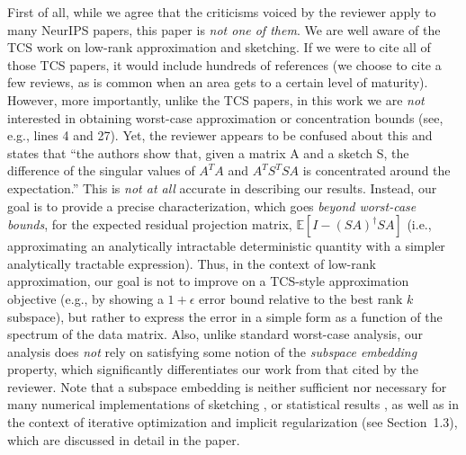 \documentclass{article}
\begin{document}
First of all, while we agree that the criticisms voiced by the
reviewer apply to many NeurIPS papers, this paper is \emph{not one of
  them}. We are well aware of the TCS work on low-rank
approximation and sketching. If we were to cite all of those TCS papers, it would
include hundreds of references (we choose to cite a few reviews, as is
common when an area gets to a certain level of maturity). However, more importantly,
unlike the TCS papers, in this work we are \emph{not} interested in obtaining
worst-case approximation or concentration bounds (see, e.g., lines 4
and 27). Yet, the reviewer appears to be
confused about this and states that ``the authors
show that, given a matrix A and a sketch S, the difference of the
singular values of $A^TA$  and $A^TS^TSA$ is concentrated around the
expectation.'' This is \emph{not at all} accurate in describing our
results. Instead, our goal is to provide a precise characterization,
which goes \emph{beyond worst-case bounds}, for the expected residual
projection matrix, $\mathbb{E}[I-(SA)^\dagger SA]$ (i.e., approximating an
analytically intractable deterministic quantity with a simpler
analytically tractable expression). Thus, in the context of low-rank
approximation, our goal is not
to improve on a TCS-style approximation objective (e.g., by showing a
$1+\epsilon$ error bound relative to the best rank $k$ subspace),
but rather to express the error in a simple form as a function of the
spectrum of the data matrix.  Also, unlike standard worst-case analysis, our analysis
does \emph{not} rely on satisfying some notion of the \emph{subspace
  embedding} property, which
significantly differentiates our work from that cited by the
reviewer. Note that a subspace embedding is
neither sufficient nor necessary for many numerical implementations of
sketching \citep{blendenpik,lsrn},
or statistical results
\citep{GarveshMahoney_JMLR,dobriban2019asymptotics,yang2020reduce},
as well as in the context of iterative optimization and
implicit regularization (see Section~1.3), which are discussed in
detail in the paper.
\end{document}
